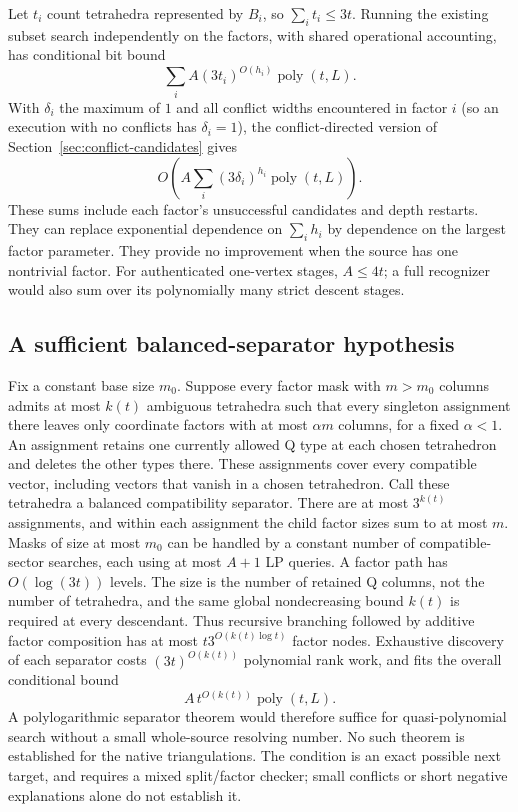 Let $t_i$ count tetrahedra represented by $B_i$, so $\sum_i t_i\le3t$.
Running the existing subset search independently on the factors, with shared
operational accounting, has conditional bit bound
\[
 \sum_i A(3t_i)^{O(h_i)}\operatorname{poly}(t,L).
\]
With $\delta_i$ the maximum of $1$ and all conflict widths encountered in
factor $i$ (so an execution with no conflicts has $\delta_i=1$), the
conflict-directed version of Section~\ref{sec:conflict-candidates} gives
\[
 O\!\left(A\sum_i(3\delta_i)^{h_i}\operatorname{poly}(t,L)\right).
\]
These sums include each factor's unsuccessful candidates and depth restarts.
They can replace exponential dependence on $\sum_i h_i$ by dependence on the
largest factor parameter.  They provide no improvement when the source has
one nontrivial factor.  For authenticated one-vertex stages, $A\le4t$; a full
recognizer would also sum over its polynomially many strict descent stages.

\subsection{A sufficient balanced-separator hypothesis}
Fix a constant base size $m_0$.  Suppose every factor mask with $m>m_0$
columns admits at most $k(t)$ ambiguous tetrahedra such that every singleton
assignment there leaves only coordinate factors with at most $\alpha m$
columns, for a fixed $\alpha<1$.  An assignment retains one currently allowed
Q type at each chosen tetrahedron and deletes the other types there.
These assignments cover every compatible vector, including vectors that
vanish in a chosen tetrahedron.  Call these tetrahedra a balanced compatibility
separator.  There are at most $3^{k(t)}$ assignments, and within each assignment
the child factor sizes sum to at most $m$.  Masks of size at most $m_0$ can be
handled by a constant number of compatible-sector searches, each using at
most $A+1$ LP queries.  A factor path has $O(\log(3t))$ levels.  The size is the number of
retained Q columns, not the number of tetrahedra, and the same global
nondecreasing bound $k(t)$ is required at every descendant.  Thus recursive
branching followed by additive factor composition has at most
$t3^{O(k(t)\log t)}$ factor nodes.  Exhaustive discovery of each separator
costs $(3t)^{O(k(t))}$ polynomial rank work, and fits the overall conditional
bound
\[
 A\,t^{O(k(t))}\operatorname{poly}(t,L).
\]
A polylogarithmic separator theorem would therefore suffice for
quasi-polynomial search without a small whole-source resolving number.
No such theorem is established for the native triangulations.  The condition
is an exact possible next target, and requires a mixed split/factor checker;
small conflicts or short negative explanations alone do not establish it.


